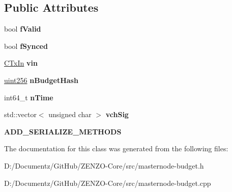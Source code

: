 \subsection*{Public Attributes}
\begin{DoxyCompactItemize}
\item 
\mbox{\label{class_c_finalized_budget_vote_aef317580b2f8a41d739e825acbdbb04a}} 
bool {\bfseries f\+Valid}
\item 
\mbox{\label{class_c_finalized_budget_vote_acf10705c636a83d7b1a45404a0195902}} 
bool {\bfseries f\+Synced}
\item 
\mbox{\label{class_c_finalized_budget_vote_adcfb3d5520f8374deac4f3b4f6eb24cc}} 
\mbox{\hyperlink{class_c_tx_in}{C\+Tx\+In}} {\bfseries vin}
\item 
\mbox{\label{class_c_finalized_budget_vote_a2aec1fb12151d1c028e755e20f452272}} 
\mbox{\hyperlink{classuint256}{uint256}} {\bfseries n\+Budget\+Hash}
\item 
\mbox{\label{class_c_finalized_budget_vote_abe49a15e472fdaaab521ae83bb9f6e42}} 
int64\+\_\+t {\bfseries n\+Time}
\item 
\mbox{\label{class_c_finalized_budget_vote_a8068f2ad5defbc62be4221ecacef011f}} 
std\+::vector$<$ unsigned char $>$ {\bfseries vch\+Sig}
\item 
\mbox{\label{class_c_finalized_budget_vote_a3f53b91508d16154326dc743775cf5e9}} 
{\bfseries A\+D\+D\+\_\+\+S\+E\+R\+I\+A\+L\+I\+Z\+E\+\_\+\+M\+E\+T\+H\+O\+DS}
\end{DoxyCompactItemize}


The documentation for this class was generated from the following files\+:\begin{DoxyCompactItemize}
\item 
D\+:/\+Documentz/\+Git\+Hub/\+Z\+E\+N\+Z\+O-\/\+Core/src/masternode-\/budget.\+h\item 
D\+:/\+Documentz/\+Git\+Hub/\+Z\+E\+N\+Z\+O-\/\+Core/src/masternode-\/budget.\+cpp\end{DoxyCompactItemize}
